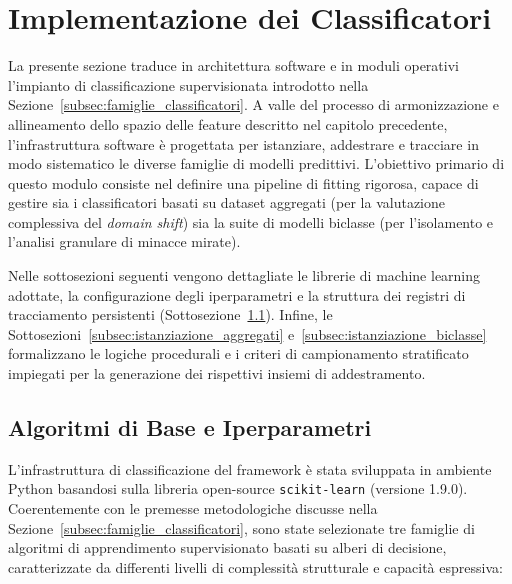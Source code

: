 \section{Implementazione dei Classificatori}
\label{sec:implementazione_classificatori}

La presente sezione traduce in architettura software e in moduli operativi l'impianto di classificazione supervisionata introdotto nella Sezione~\ref{subsec:famiglie_classificatori}. 
A valle del processo di armonizzazione e allineamento dello spazio delle feature descritto nel capitolo precedente, l'infrastruttura software è progettata per istanziare, addestrare e tracciare in modo sistematico le diverse famiglie di modelli predittivi. 
L'obiettivo primario di questo modulo consiste nel definire una pipeline di fitting rigorosa, capace di gestire sia i classificatori basati su dataset aggregati (per la valutazione complessiva del \textit{domain shift}) sia la suite di modelli biclasse (per l'isolamento e l'analisi granulare di minacce mirate).

Nelle sottosezioni seguenti vengono dettagliate le librerie di machine learning adottate, la configurazione degli iperparametri e la struttura dei registri di tracciamento persistenti (Sottosezione~\ref{subsec:algoritmi_iperparametri}). 
Infine, le Sottosezioni~\ref{subsec:istanziazione_aggregati} e~\ref{subsec:istanziazione_biclasse} formalizzano le logiche procedurali e i criteri di campionamento stratificato impiegati per la generazione dei rispettivi insiemi di addestramento.


\subsection{Algoritmi di Base e Iperparametri}
\label{subsec:algoritmi_iperparametri}

L'infrastruttura di classificazione del framework è stata sviluppata in ambiente Python basandosi sulla libreria open-source \texttt{scikit-learn} (versione 1.9.0). 
Coerentemente con le premesse metodologiche discusse nella Sezione~\ref{subsec:famiglie_classificatori}, sono state selezionate tre famiglie di algoritmi di apprendimento supervisionato basati su alberi di decisione, caratterizzate da differenti livelli di complessità strutturale e capacità espressiva:

